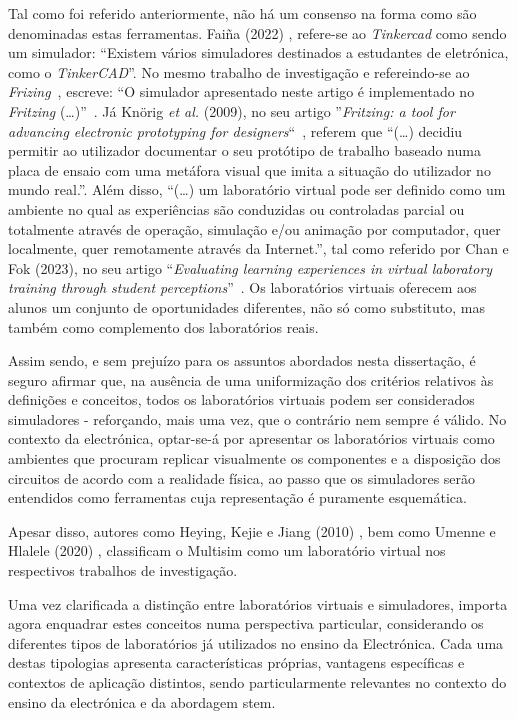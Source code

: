 Tal como foi referido anteriormente, não há um consenso na forma como são denominadas estas ferramentas. Faiña (2022) \cite{faina}, refere-se ao \textit{Tinkercad} como sendo um simulador: ``Existem vários simuladores destinados a estudantes de eletrónica, como o \textit{TinkerCAD}''. No mesmo trabalho de investigação e refereindo-se ao \textit{Frizing}~\cite{fritzingdown}, escreve: ``O simulador apresentado neste artigo é implementado no \textit{Fritzing} (\ldots)''~\cite{faina}. Já Knörig \textit{et al.} (2009), no seu artigo ''\textit{Fritzing: a tool for advancing electronic prototyping for designers}``~\cite{Knorig2009Feb}, referem que ``(\ldots) decidiu permitir ao utilizador documentar o seu protótipo de trabalho baseado numa placa de ensaio com uma metáfora visual que imita a situação do utilizador no mundo real.''. Além disso, ``(\ldots) um laboratório virtual pode ser definido como um ambiente no qual as experiências são conduzidas ou controladas parcial ou totalmente através de operação, simulação e/ou animação por computador, quer localmente, quer remotamente através da Internet.'', tal como referido por Chan e Fok (2023), no seu artigo ``\textit{Evaluating learning experiences in virtual laboratory training through student perceptions}''~\cite{EvaluatingLearningExperiencesVirtualLaboratoryHongKong}. Os laboratórios virtuais oferecem aos alunos um conjunto de oportunidades diferentes, não só como substituto, mas também como complemento dos laboratórios reais.

Assim sendo, e sem prejuízo para os assuntos abordados nesta dissertação, é seguro afirmar que, na ausência de uma uniformização dos critérios relativos às definições e conceitos, todos os laboratórios virtuais podem ser considerados simuladores - reforçando, mais uma vez, que o contrário nem sempre é válido. No contexto da electrónica, optar-se-á por apresentar os laboratórios virtuais como ambientes que procuram replicar visualmente os componentes e a disposição dos circuitos de acordo com a realidade física, ao passo que os simuladores serão entendidos como ferramentas cuja representação é puramente esquemática.

Apesar disso, autores como Heying, Kejie e Jiang (2010) \cite{multisimVLHeying}, bem como Umenne e Hlalele (2020) \cite{multisimVLUmenne}, classificam o Multisim \cite{multisim} como um laboratório virtual nos respectivos trabalhos de investigação.

Uma vez clarificada a distinção entre laboratórios virtuais e simuladores, importa agora enquadrar estes conceitos numa perspectiva particular, considerando os diferentes tipos de laboratórios já utilizados no ensino da Electrónica. Cada uma destas tipologias apresenta características próprias, vantagens específicas e contextos de aplicação distintos, sendo particularmente relevantes no contexto do ensino da electrónica e da abordagem \acrshort{stem}.

